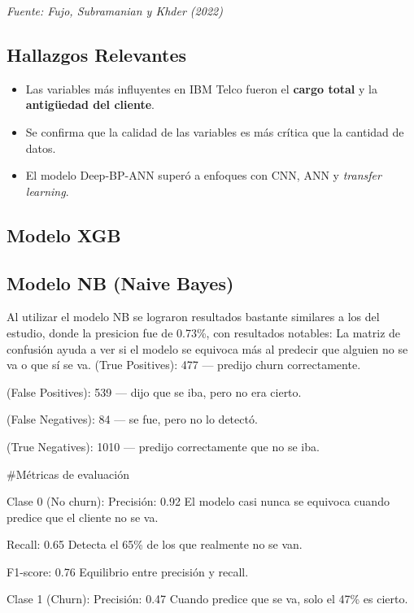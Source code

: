 \documentclass[
  letterpaper,
  DIV=11,
  numbers=noendperiod]{scrartcl}
\providecommand{\tightlist}{%
  \setlength{\itemsep}{0pt}\setlength{\parskip}{0pt}}\usepackage{longtable,booktabs,array}
\begin{document}
\emph{Fuente: Fujo, Subramanian y Khder (2022)}

\subsection{Hallazgos Relevantes}\label{hallazgos-relevantes}

\begin{itemize}
\tightlist
\item
  Las variables más influyentes en IBM Telco fueron el \textbf{cargo
  total} y la \textbf{antigüedad del cliente}.
\item
  Se confirma que la calidad de las variables es más crítica que la
  cantidad de datos.
\item
  El modelo Deep-BP-ANN superó a enfoques con CNN, ANN y \emph{transfer
  learning}.
\end{itemize}

\subsection{Modelo XGB}\label{modelo-xgb}

\subsection{Modelo NB (Naive Bayes)}\label{modelo-nb-naive-bayes}

Al utilizar el modelo NB se lograron resultados bastante similares a los
del estudio, donde la presicion fue de 0.73\%, con resultados notables:
La matriz de confusión ayuda a ver si el modelo se equivoca más al
predecir que alguien no se va o que sí se va. (True Positives): 477 ---
predijo churn correctamente.

(False Positives): 539 --- dijo que se iba, pero no era cierto.

(False Negatives): 84 --- se fue, pero no lo detectó.

(True Negatives): 1010 --- predijo correctamente que no se iba.

\#Métricas de evaluación

Clase 0 (No churn): Precisión: 0.92 El modelo casi nunca se equivoca
cuando predice que el cliente no se va.

Recall: 0.65 Detecta el 65\% de los que realmente no se van.

F1-score: 0.76 Equilibrio entre precisión y recall.

Clase 1 (Churn): Precisión: 0.47 Cuando predice que se va, solo el 47\%
es cierto.
\end{document}

